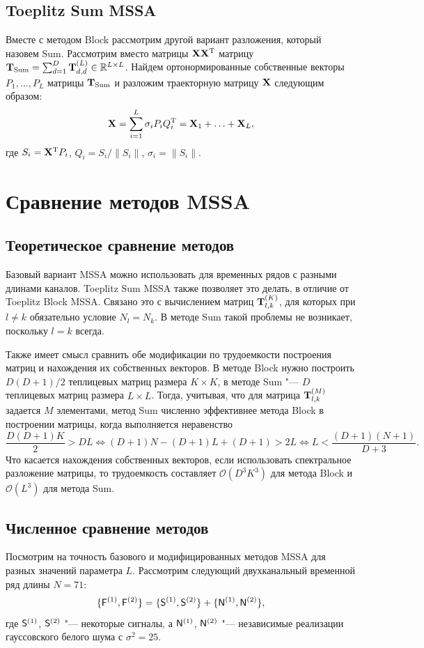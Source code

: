 \documentclass[specialist,
substylefile = spbu_report.rtx,
subf,href,colorlinks=true, 12pt]{disser}
\theoremstyle{definition}
\newcommand{\R}{\mathbb{R}}
\begin{document}
\subsection{Toeplitz Sum MSSA}\label{sect:sum}
Вместе с методом Block рассмотрим другой вариант разложения, который назовем Sum. Рассмотрим вместо матрицы $\mathbf{X}\mathbf{X}^{\mathrm{T}}$ матрицу $\bfT_{\text{Sum}}=\sum_{d=1}^D \bfT_{d,d}^{(L)}\in\R^{L\times L}$. Найдем ортонормированные собственные векторы $P_1,\ldots,P_L$ матрицы $\mathbf{T}_{\text{Sum}}$ и разложим траекторную матрицу $\mathbf{X}$ следующим образом:
\begin{equation}\label{eq:sum_decomposition}
	\mathbf{X}=\sum_{i=1}^L\sigma_i P_iQ_i^{\mathrm{T}}=\mathbf{X}_1+\ldots+\mathbf{X}_L,
\end{equation}
где $S_i=\mathbf{X}^{\mathrm{T}} P_i$, $Q_i=S_i/\|S_i\|$, $\sigma_i=\|S_i\|$.

\section{Сравнение методов MSSA}\label{sect:mssa_comparison}
\subsection{Теоретическое сравнение методов}
Базовый вариант MSSA можно использовать для временных рядов с разными длинами каналов. Toeplitz Sum MSSA также позволяет это делать, в отличие от Toeplitz Block MSSA. Связано это с вычислением матриц $\mathbf{T}_{l,k}^{(K)}$, для которых при $l\ne k$ обязательно условие $N_l=N_k$. В методе Sum такой проблемы не возникает, поскольку $l=k$ всегда.

Также имеет смысл сравнить обе модификации по трудоемкости построения матриц и нахождения их собственных векторов. В методе Block нужно построить $D(D+1)/2$ теплицевых матриц размера $K\times K$, в методе Sum "--- $D$ теплицевых матриц размера $L\times L$. Тогда, учитывая, что для матрица $\mathbf{T}_{l,k}^{(M)}$ задается $M$ элементами, метод Sum численно эффективнее метода Block в построении матрицы, когда выполняется неравенство
\begin{equation*}
	\frac{D(D+1)K}2 > DL \iff (D+1)N - (D+1)L + (D+1) > 2L \iff L < \frac{(D+1)(N+1)}{D+3}.
\end{equation*}
Что касается нахождения собственных векторов, если использовать спектральное разложение матрицы, то трудоемкость составляет $\mathcal{O}(D^3K^3)$ для метода Block и $\mathcal{O}(L^3)$ для метода Sum.

\subsection{Численное сравнение методов}
Посмотрим на точность базового и модифицированных методов MSSA для разных значений параметра $L$. Рассмотрим следующий двухканальный временной ряд длины ${N=71}$:
$$\{\mathsf{F}^{(1)}, \mathsf{F}^{(2)}\}=\{\mathsf{S}^{(1)},\mathsf{S}^{(2)}\} + \{\mathsf{N}^{(1)},\mathsf{N}^{(2)}\},$$
где $\mathsf{S}^{(1)}$, $\mathsf{S}^{(2)}$ "--- некоторые сигналы, а $\mathsf{N}^{(1)}$, $\mathsf{N}^{(2)}$ "--- независимые реализации гауссовского белого шума с $\sigma^2=25$.
\end{document}
